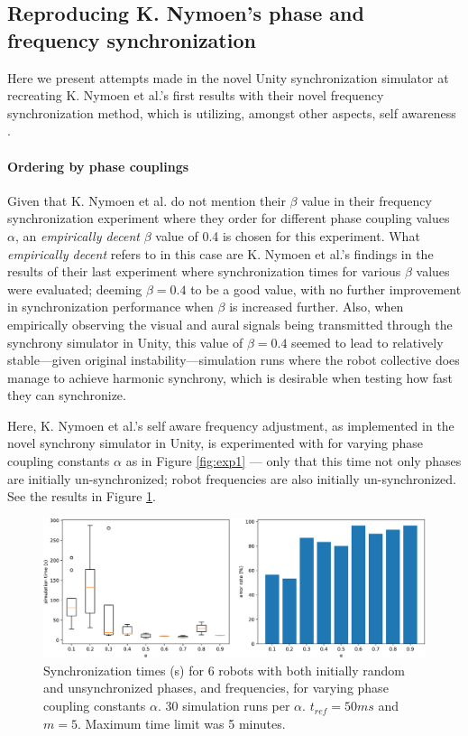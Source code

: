 	\subsection{Reproducing K. Nymoen's phase and frequency synchronization}
		Here we present attempts made in the novel Unity synchronization simulator at recreating K. Nymoen et al.'s first results with their novel frequency synchronization method, which is utilizing, amongst other aspects, self awareness \cite{nymoen_synch}.
		
		\paragraph{Ordering by phase couplings}
		Given that K. Nymoen et al. do not mention their $\beta$ value in their frequency synchronization experiment where they order for different phase coupling values $\alpha$, an \textit{empirically decent} $\beta$ value of 0.4 is chosen for this experiment. What \textit{empirically decent} refers to in this case are K. Nymoen et al.'s findings in the results of their last experiment \cite{nymoen_synch} where synchronization times for various $\beta$ values were evaluated; deeming $\beta=0.4$ to be a good value, with no further improvement in synchronization performance when $\beta$ is increased further. Also, when empirically observing the visual and aural signals being transmitted through the synchrony simulator in Unity, this value of $\beta=0.4$ seemed to lead to relatively stable—given original instability—simulation runs where the robot collective does manage to achieve harmonic synchrony, which is desirable when testing how fast they can synchronize.
		
		Here, K. Nymoen et al.'s self aware frequency adjustment, as implemented in the novel synchrony simulator in Unity, is experimented with for varying phase coupling constants $\alpha$ as in Figure \ref{fig:exp1} — only that this time not only phases are initially un-synchronized; robot frequencies are also initially un-synchronized. See the results in Figure \ref{fig:exp2}.
		
		\begin{figure}[ht!]
			\centering
			\includegraphics[width=\linewidth]{Assets/DocSegments/Chapters/ExperimentsAndResults/Figures/PerfScores/experiment2_perfScores.pdf}
			\caption{Synchronization times (s) for 6 robots with both initially random and unsynchronized phases, and frequencies, for varying phase coupling constants $\alpha$. 30 simulation runs per $\alpha$. $t_{ref}=50ms$ and $m=5$. Maximum time limit was 5 minutes.}
			\label{fig:exp2}
		\end{figure}
		
